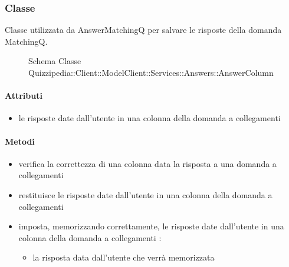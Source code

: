 \subsubsection{Classe }
Classe utilizzata da AnswerMatchingQ per salvare le risposte della domanda MatchingQ.
\begin{figure}[H]
\centering
\noindent{}
\caption[Schema Classe AnswerColumn]{Schema Classe Quizzipedia::Client::ModelClient::Services::Answers::AnswerColumn}
\end{figure}
\paragraph{Attributi}
\begin{itemize}
\item {}
\newline
le risposte date dall'utente in una colonna della domanda a collegamenti
\end{itemize}
\paragraph{Metodi}
\begin{itemize}
\item {}
\newline
verifica la correttezza di una colonna data la risposta a una domanda a collegamenti
\newline
\item {}
\newline
restituisce le risposte date dall'utente in una colonna della domanda a collegamenti
\newline
\item {}
\newline
imposta, memorizzando correttamente, le risposte date dall'utente in una colonna della domanda a collegamenti
\newline
{} :
\begin{itemize}
\item {}
\newline
la risposta data dall'utente che verrà memorizzata
\end{itemize}
\end{itemize}
